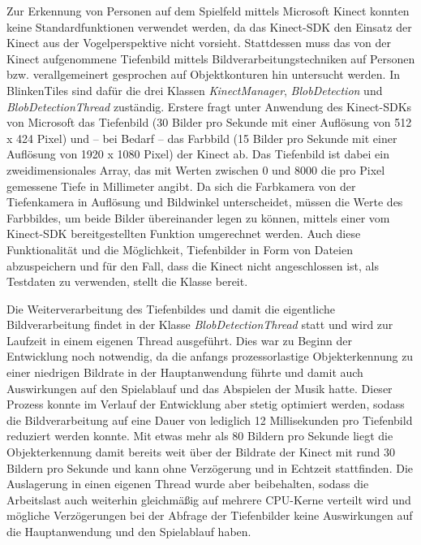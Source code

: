 \label{sec:objdet}

Zur Erkennung von Personen auf dem Spielfeld mittels Microsoft Kinect konnten keine Standardfunktionen verwendet werden, da das Kinect-SDK den Einsatz der Kinect aus der Vogelperspektive nicht vorsieht. Stattdessen muss das von der Kinect aufgenommene Tiefenbild mittels Bildverarbeitungstechniken auf Personen bzw. verallgemeinert gesprochen auf Objektkonturen hin untersucht werden. In BlinkenTiles sind dafür die drei Klassen \emph{KinectManager}, \emph{BlobDetection} und \emph{BlobDetectionThread} zuständig. Erstere fragt unter Anwendung des Kinect-SDKs von Microsoft das Tiefenbild (30 Bilder pro Sekunde mit einer Auflösung von 512 x 424 Pixel) und -- bei Bedarf -- das Farbbild (15 Bilder pro Sekunde mit einer Auflösung von 1920 x 1080 Pixel) der Kinect ab. Das Tiefenbild ist dabei ein zweidimensionales Array, das mit Werten zwischen 0 und 8000 die pro Pixel gemessene Tiefe in Millimeter angibt. Da sich die Farbkamera von der Tiefenkamera in Auflösung und Bildwinkel unterscheidet, müssen die Werte des Farbbildes, um beide Bilder übereinander legen zu können, mittels einer vom Kinect-SDK bereitgestellten Funktion umgerechnet werden. Auch diese Funktionalität und die Möglichkeit, Tiefenbilder in Form von Dateien abzuspeichern und für den Fall, dass die Kinect nicht angeschlossen ist, als Testdaten zu verwenden, stellt die Klasse bereit.

Die Weiterverarbeitung des Tiefenbildes und damit die eigentliche Bildverarbeitung findet in der Klasse \emph{BlobDetectionThread} statt und wird zur Laufzeit in einem eigenen Thread ausgeführt. Dies war zu Beginn der Entwicklung noch notwendig, da die anfangs prozessorlastige Objekterkennung zu einer niedrigen Bildrate in der Hauptanwendung führte und damit auch Auswirkungen auf den Spielablauf und das Abspielen der Musik hatte. Dieser Prozess konnte im Verlauf der Entwicklung aber stetig optimiert werden, sodass die Bildverarbeitung auf eine Dauer von lediglich 12 Millisekunden pro Tiefenbild reduziert werden konnte. Mit etwas mehr als 80 Bildern pro Sekunde liegt die Objekterkennung damit bereits weit über der Bildrate der Kinect mit rund 30 Bildern pro Sekunde und kann ohne Verzögerung und in Echtzeit stattfinden. Die Auslagerung in einen eigenen Thread wurde aber beibehalten, sodass die Arbeitslast auch weiterhin gleichmäßig auf mehrere CPU-Kerne verteilt wird und mögliche Verzögerungen bei der Abfrage der Tiefenbilder keine Auswirkungen auf die Hauptanwendung und den Spielablauf haben.

